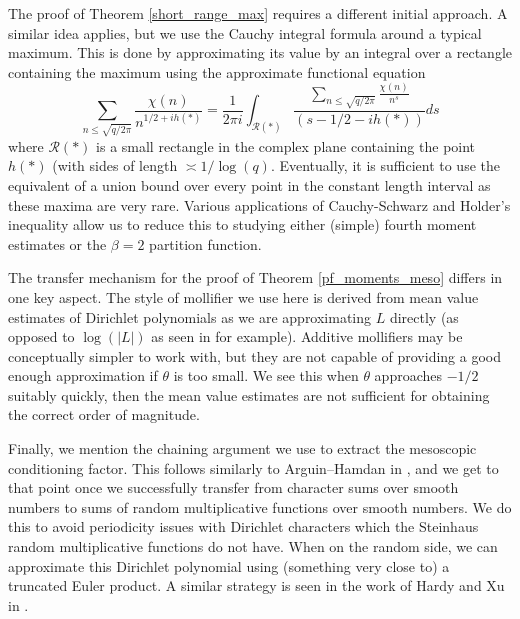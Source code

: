 \documentclass[reqno]{amsart}
\theoremstyle{definition}
\theoremstyle{remark}
\numberwithin{equation}{section}
\theoremstyle{remark}
\begin{document}
The proof of Theorem \ref{short_range_max} requires a different initial approach. A similar idea applies, but we use the Cauchy integral formula around a typical maximum. This is done by approximating its value by an integral over a rectangle containing the maximum using the approximate functional equation
$$\sum_{n \leq \sqrt{q/2\pi}}\frac{\chi(n)}{n^{1/2+ih(*)}} = \frac{1}{2\pi i}\int_{\mathcal{R}(*)}\frac{\sum_{n \leq \sqrt{q/2\pi}}\frac{\chi(n)}{n^s}}{(s-1/2-ih(*))}ds$$
where $\mathcal{R}(*)$ is a small rectangle in the complex plane containing the point $h(*)$ (with sides of length $\asymp 1/\log(q)$. Eventually, it is sufficient to use the equivalent of a union bound over every point in the constant length interval as these maxima are very rare. Various applications of Cauchy-Schwarz and Holder's inequality allow us to reduce this to studying either (simple) fourth moment estimates or the $\beta=2$ partition function. \par
The transfer mechanism for the proof of Theorem \ref{pf_moments_meso} differs in one key aspect. The style of mollifier we use here is derived from mean value estimates of Dirichlet polynomials as we are approximating $L$ directly (as opposed to $\log(|L|)$ as seen in \cite{abr20} for example). Additive mollifiers may be conceptually simpler to work with, but they are not capable of providing a good enough approximation if $\theta$ is too small. We see this when $\theta$ approaches $-1/2$ suitably quickly, then the mean value estimates are not sufficient for obtaining the correct order of magnitude. \par 
Finally, we mention the chaining argument we use to extract the mesoscopic conditioning factor. This follows similarly to Arguin--Hamdan in \cite{ah24}, and we get to that point once we successfully transfer from character sums over smooth numbers to sums of random multiplicative functions over smooth numbers. We do this to avoid periodicity issues with Dirichlet characters which the Steinhaus random multiplicative functions do not have. When on the random side, we can approximate this Dirichlet polynomial using (something very close to) a truncated Euler product. A similar strategy is seen in the work of Hardy and Xu in \cite{hx26}.
\end{document}
